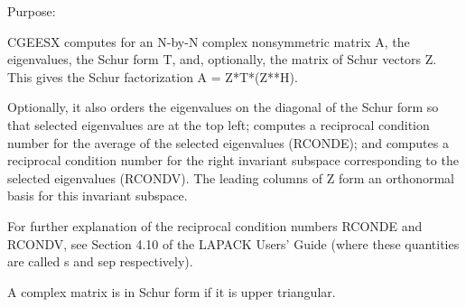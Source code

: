  \begin{DoxyParagraph}{Purpose\+: }
\begin{DoxyVerb} CGEESX computes for an N-by-N complex nonsymmetric matrix A, the
 eigenvalues, the Schur form T, and, optionally, the matrix of Schur
 vectors Z.  This gives the Schur factorization A = Z*T*(Z**H).

 Optionally, it also orders the eigenvalues on the diagonal of the
 Schur form so that selected eigenvalues are at the top left;
 computes a reciprocal condition number for the average of the
 selected eigenvalues (RCONDE); and computes a reciprocal condition
 number for the right invariant subspace corresponding to the
 selected eigenvalues (RCONDV).  The leading columns of Z form an
 orthonormal basis for this invariant subspace.

 For further explanation of the reciprocal condition numbers RCONDE
 and RCONDV, see Section 4.10 of the LAPACK Users' Guide (where
 these quantities are called s and sep respectively).

 A complex matrix is in Schur form if it is upper triangular.\end{DoxyVerb}
 
\end{DoxyParagraph}

